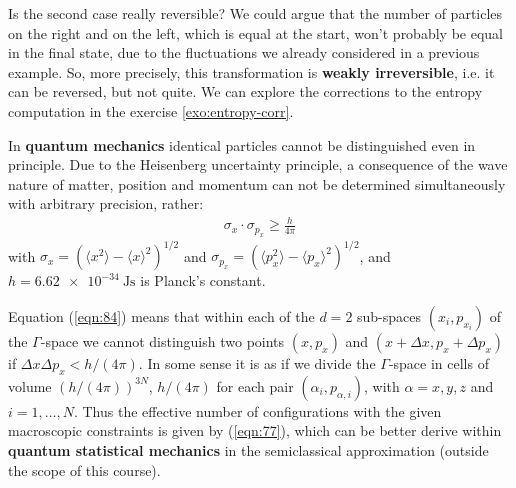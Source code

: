 \documentclass[../template.tex]{subfiles}
\begin{document}
\begin{appr}
    Is the second case really reversible? We could argue that the number of particles on the right and on the left, which is equal at the start, won't probably be equal in the final state, due to the fluctuations we already considered in a previous example. So, more precisely, this transformation is \textbf{weakly irreversible}, i.e. it can  be reversed, but not quite. We can explore the corrections to the entropy computation in the exercise \ref{exo:entropy-corr}.
\end{appr}

\begin{exo}\label{exo:entropy-corr}
    
\end{exo}

In \textbf{quantum mechanics} identical particles cannot be distinguished even in principle. Due to the Heisenberg uncertainty principle, a consequence of the wave nature of matter, position and momentum can not be determined simultaneously with arbitrary precision, rather:
\begin{align}\label{eqn:84}
    \sigma_x \cdot \sigma_{p_x} \geq \frac{h}{4 \pi} 
\end{align} 
with $\sigma_x = (\langle x^2 \rangle - \langle x \rangle^2)^{1/2}$ and $\sigma_{p_x} = (\langle p_x^2 \rangle - \langle p_x \rangle^2)^{1/2}$, and $h = \SI{6.62e-34}{\J\s}$ is Planck's constant.


Equation (\ref{eqn:84}) means that within each of the $d=2$ sub-spaces $(x_i, p_{x_i})$ of the $\Gamma$-space we cannot distinguish two points $(x,p_x)$ and $(x+\Delta x, p_x + \Delta p_x)$ if $\Delta x \Delta p_x < h/(4\pi)$. In some sense it is as if we divide the $\Gamma$-space in cells of volume $(h/(4\pi))^{3N}$, $h/(4\pi)$ for each pair $(\alpha_i, p_{\alpha,i})$, with $\alpha=x,y,z$ and $i=1,\dots,N$. Thus the effective number of  configurations with the given macroscopic constraints is given by (\ref{eqn:77}), which can be better derive within \textbf{quantum statistical mechanics} in the semiclassical approximation (outside the scope of this course). 
\end{document}
